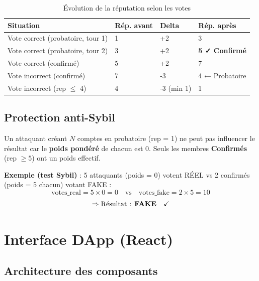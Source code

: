 \documentclass[12pt,a4paper]{article}
\newenvironment{warnbox}[1][Attention]{%
  \begin{tcolorbox}[
    enhanced, breakable,
    colback=warning!8, colframe=warning!70, coltitle=white,
    title=\textbf{#1}, fonttitle=\small,
    arc=4pt, boxrule=0.8pt,
    left=6pt, right=6pt, top=5pt, bottom=5pt
  ]
}{\end{tcolorbox}}
\begin{document}
\begin{table}[H]
\centering
\renewcommand{\arraystretch}{1.5}
\begin{tabular}{L{4.5cm} C{3cm} C{2cm} C{3cm}}
\toprule
{}
\textbf{Situation} & \textbf{Rép. avant} & \textbf{Delta} & \textbf{Rép. après} \\
\midrule
Vote correct (probatoire, tour 1) & 1 & \textcolor{success}{+2} & 3 \\
Vote correct (probatoire, tour 2) & 3 & \textcolor{success}{+2} & \textbf{5 ✓ Confirmé} \\
Vote correct (confirmé)           & 5 & \textcolor{success}{+2} & 7 \\
Vote incorrect (confirmé)         & 7 & \textcolor{danger}{-3}  & 4 ← Probatoire \\
Vote incorrect (rep $\leq$ 4)     & 4 & \textcolor{danger}{-3 (min 1)} & 1 \\
\bottomrule
\end{tabular}
\caption{Évolution de la réputation selon les votes}
\end{table}

\subsection{Protection anti-Sybil}

\begin{warnbox}[Résistance aux attaques Sybil]
Un attaquant créant $N$ comptes en probatoire (rep = 1) ne peut pas influencer le résultat car le \textbf{poids pondéré} de chacun est 0. Seuls les membres \textbf{Confirmés} (rep $\geq 5$) ont un poids effectif.

\medskip
\textbf{Exemple (test Sybil)} : 5 attaquants (poids = 0) votent RÉEL vs 2 confirmés (poids = 5 chacun) votant FAKE :
$$\text{votes\_real} = 5 \times 0 = 0 \quad \text{vs} \quad \text{votes\_fake} = 2 \times 5 = 10$$
$$\Rightarrow \text{Résultat : \textbf{FAKE}} \quad \checkmark$$
\end{warnbox}

\section{Interface DApp (React)}

\subsection{Architecture des composants}
\end{document}
